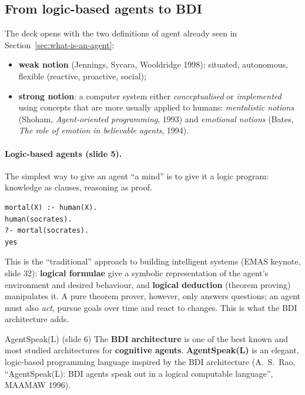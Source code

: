 \subsection{From logic-based agents to BDI}
\label{sec:logic-based-agents}

The deck opens with the two definitions of agent already seen in
Section~\ref{sec:what-is-an-agent}:
\begin{itemize}[nosep]
  \item \textbf{weak notion} (Jennings, Sycara, Wooldridge 1998): situated, autonomous,
        flexible (reactive, proactive, social);
  \item \textbf{strong notion}: a computer system either \emph{conceptualised} or
        \emph{implemented} using concepts that are more usually applied to humans:
        \emph{mentalistic notions} (Shoham, \emph{Agent-oriented programming}, 1993) and
        \emph{emotional notions} (Bates, \emph{The role of emotion in believable agents},
        1994).
\end{itemize}

\paragraph{Logic-based agents (slide 5).} The simplest way to give an agent ``a mind'' is to
give it a logic program: knowledge as clauses, reasoning as proof.
\begin{verbatim}
mortal(X) :- human(X).
human(socrates).
?- mortal(socrates).
yes
\end{verbatim}
This is the ``traditional'' approach to building intelligent systems (EMAS keynote, slide
32): \textbf{logical formulae} give a symbolic representation of the agent's environment and
desired behaviour, and \textbf{logical deduction} (theorem proving) manipulates it. A pure
theorem prover, however, only answers questions; an agent must also \emph{act}, pursue goals
over time and react to changes. This is what the BDI architecture adds.

\begin{nbfact}{AgentSpeak(L) (slide 6)}
The \textbf{BDI architecture} is one of the best known and most studied architectures for
\textbf{cognitive agents}. \textbf{AgentSpeak(L)} is an elegant, logic-based programming
language inspired by the BDI architecture (A.~S.~Rao, ``AgentSpeak(L): BDI agents speak out
in a logical computable language'', MAAMAW 1996).
\end{nbfact}
